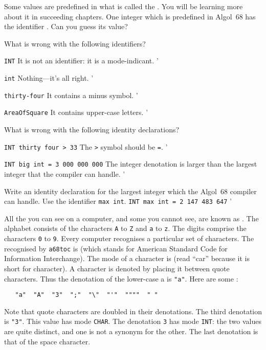 Some values are predefined in what is called the
. You will be learning more about it in
succeeding chapters.  One integer which is predefined in Algol~68 has
the identifier . Can you guess its value?

\begin{exercise}
\item What is wrong with the following identifiers?
\begin{subex}
\item \verb|INT| \subans It is not an identifier: it is a
mode-indicant.
'
\item \verb|int| \subans Nothing---it's all right.
'
\item \verb|thirty-four| \subans It contains a minus symbol.
'
\item \verb|AreaOfSquare|
\subans It contains upper-case letters.
'
\end{subex}
\item What is wrong with the following identity declarations?
\begin{subex}
\item \verb|INT thirty four > 33| \subans The \verb|>| symbol should
be \verb|=|.
'
\item \verb|INT big int = 3 000 000 000| \subans The integer
denotation is larger than the largest integer that the compiler can
handle.
'
\end{subex}
\item Write an identity declaration for the largest integer which the
Algol~68 compiler can handle. Use the identifier\newline
\verb|max int|. \ans \verb|INT max int = 2 147 483 647|
'
\end{exercise}

All the  you can see on a computer, and some you
cannot see, are known as .  The alphabet
consists of the characters \verb|A| to \verb|Z| and \verb|a| to
\verb|z|.  The digits comprise the characters \verb|0| to \verb|9|. 
Every computer recognises a particular set of characters.  The
 recognised by \verb|a68toc|
is  (which stands for American
Standard Code for Information Interchange). The mode of a character is
 (read ``car'' because it is short for
character).  A character is denoted by placing it between quote
characters.  Thus the denotation of the lower-case a is \verb|"a"|. 
Here are some :
\begin{verbatim}
   "a"  "A"  "3"  ";"  "\"  "'"  """"  " "
\end{verbatim}
\noindent
Note that quote characters are doubled in their denotations.  The
third denotation is \verb|"3"|.  This value has mode \verb|CHAR|.
The denotation \verb|3| has mode \verb|INT|: the two values are quite
distinct, and one is not a synonym for the other.  The last
denotation is that of the space character.

